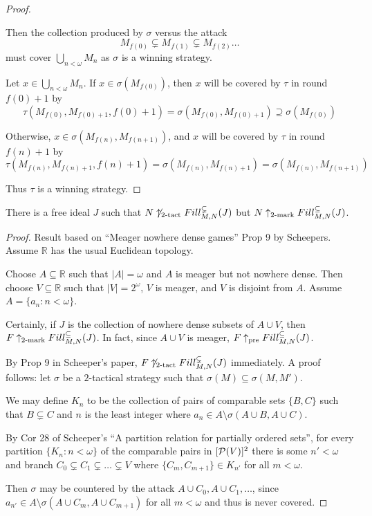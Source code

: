 \begin{proof}
\begin{itemize}
          Then the collection produced by $\sigma$ versus the attack 
            \[
              M_{f(0)}\subsetneq M_{f(1)} \subsetneq M_{f(2)} \dots
            \]
          must cover $\bigcup_{n<\omega}M_n$ as $\sigma$ is a winning strategy.

          Let $x \in \bigcup_{n<\omega}M_n$. If $x\in\sigma(M_{f(0)})$, then $x$ will be covered by $\tau$ in round $f(0)+1$ by
            \[
              \tau(M_{f(0)},M_{f(0)+1},f(0)+1)
              = \sigma(M_{f(0)},M_{f(0)+1})
              \supseteq \sigma(M_{f(0)})
            \]

          Otherwise, $x\in\sigma(M_{f(n)},M_{f(n+1)})$, and $x$ will be covered by $\tau$ in round $f(n)+1$ by
            \[
              \tau(M_{f(n)},M_{f(n)+1},f(n)+1)
              = \sigma(M_{f(n)},M_{f(n)+1})
              = \sigma(M_{f(n)},M_{f(n+1)})
            \]
      \end{itemize}

      Thus $\tau$ is a winning strategy.
  \end{proof}

  \begin{example}
    There is a free ideal $J$ such that $N\not\uparrow_{2\text{-tact}}Fill^{\subsetneq}_{M,N}(J)$ but $N\uparrow_{2\text{-mark}}Fill^{\subseteq}_{M,N}(J)$.
  \end{example}

  \begin{proof}
    Result based on ``Meager nowhere dense games'' Prop 9 by Scheepers. Assume $\mathbb{R}$ has the usual Euclidean topology.

    Choose $A\subseteq\mathbb{R}$ such that $|A|=\omega$ and $A$ is meager but not nowhere dense. Then choose $V\subseteq\mathbb{R}$ such that $|V|=2^\omega$, $V$ is meager, and $V$ is disjoint from $A$. Assume $A=\{a_n:n<\omega\}$.

    Certainly, if $J$ is the collection of nowhere dense subsets of $A\cup V$, then $F\uparrow_{2\text{-mark}}Fill^{\subseteq}_{M,N}(J)$. In fact, since $A\cup V$ is meager, $F\uparrow_{\text{pre}}Fill^{\subseteq}_{M,N}(J)$. 

    By Prop 9 in Scheeper's paper, $F\not\uparrow_{2\text{-tact}}Fill^{\subsetneq}_{M,N}(J)$ immediately. A proof follows: let $\sigma$ be a $2$-tactical strategy such that $\sigma(M)\subseteq\sigma(M,M')$.

    We may define $K_n$ to be the collection of pairs of comparable sets $\{B,C\}$ such that $B\subsetneq C$ and $n$ is the least integer where $a_n \in A \setminus \sigma(A\cup B,A\cup C)$.

    By Cor 28 of Scheeper's ``A partition relation for partially ordered sets'', for every partition $\{K_n:n<\omega\}$ of the comparable pairs in $[\mathcal{P}(V)]^2$ there is some $n'<\omega$ and branch $C_0\subsetneq C_1\subsetneq \dots\subsetneq V$ where $\{C_m,C_{m+1}\}\in K_{n'}$ for all $m<\omega$.

    Then $\sigma$ may be countered by the attack $A\cup C_0, A\cup C_1, \dots$, since $a_{n'} \in A \setminus \sigma(A\cup C_m,A\cup C_{m+1})$ for all $m<\omega$ and thus is never covered.
  \end{proof}

